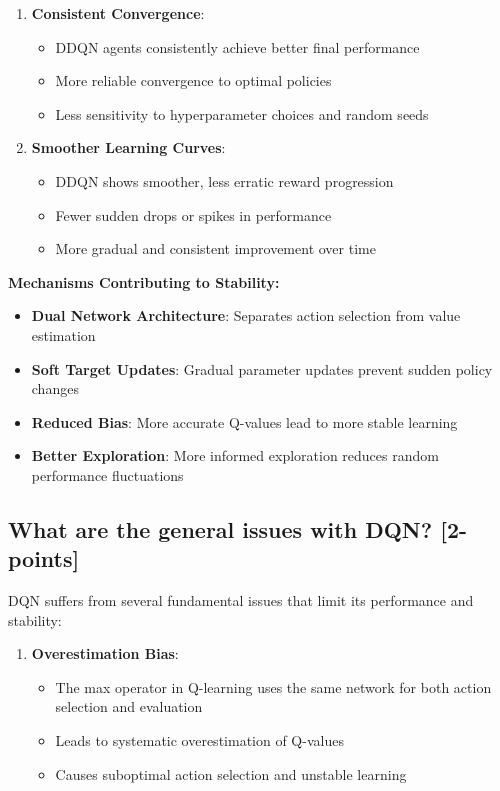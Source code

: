 \documentclass[12pt]{article}
\begin{document}
{{{\begin{enumerate}
    \item \textbf{Consistent Convergence}:
    \begin{itemize}
        \item DDQN agents consistently achieve better final performance
        \item More reliable convergence to optimal policies
        \item Less sensitivity to hyperparameter choices and random seeds
    \end{itemize}
    
    \item \textbf{Smoother Learning Curves}:
    \begin{itemize}
        \item DDQN shows smoother, less erratic reward progression
        \item Fewer sudden drops or spikes in performance
        \item More gradual and consistent improvement over time
    \end{itemize}
\end{enumerate}

\textbf{Mechanisms Contributing to Stability:}
\begin{itemize}
    \item \textbf{Dual Network Architecture}: Separates action selection from value estimation
    \item \textbf{Soft Target Updates}: Gradual parameter updates prevent sudden policy changes
    \item \textbf{Reduced Bias}: More accurate Q-values lead to more stable learning
    \item \textbf{Better Exploration}: More informed exploration reduces random performance fluctuations
\end{itemize}

\subsection{What are the general issues with DQN? [2-points]}

DQN suffers from several fundamental issues that limit its performance and stability:

\begin{enumerate}
    \item \textbf{Overestimation Bias}:
    \begin{itemize}
        \item The max operator in Q-learning uses the same network for both action selection and evaluation
        \item Leads to systematic overestimation of Q-values
        \item Causes suboptimal action selection and unstable learning
    \end{itemize}
    

\end{enumerate}}}}
\end{document}
